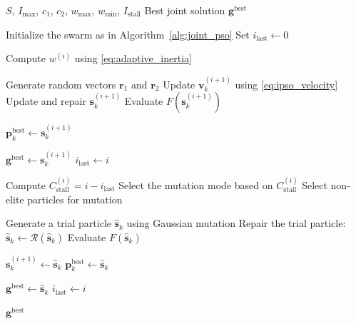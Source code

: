\documentclass[conference]{IEEEtran}
\begin{document}
\begin{algorithm}[!t]
\caption{Improved Joint PSO Algorithm}
\label{alg:ipso}
\footnotesize
\begin{algorithmic}[1]
\Require $S$, $I_{\max}$, $c_1$, $c_2$, $w_{\max}$, $w_{\min}$, $I_{\mathrm{stall}}$
\Ensure Best joint solution $\mathbf{g}^{\mathrm{best}}$

\State Initialize the swarm as in Algorithm~\ref{alg:joint_pso}
\State Set $i_{\mathrm{last}} \leftarrow 0$

    \State Compute $w^{(i)}$ using \eqref{eq:adaptive_inertia}

        \State Generate random vectors $\mathbf{r}_1$ and $\mathbf{r}_2$
        \State Update $\mathbf{v}_k^{(i+1)}$ using \eqref{eq:ipso_velocity}
        \State Update and repair $\mathbf{s}_k^{(i+1)}$
        \State Evaluate $F(\mathbf{s}_k^{(i+1)})$

            \State $\mathbf{p}_k^{\mathrm{best}} \leftarrow \mathbf{s}_k^{(i+1)}$
        \EndIf

            \State $\mathbf{g}^{\mathrm{best}} \leftarrow \mathbf{s}_k^{(i+1)}$
            \State $i_{\mathrm{last}} \leftarrow i$
        \EndIf
    \EndFor

    \State Compute $C_{\mathrm{stall}}^{(i)} = i - i_{\mathrm{last}}$
    \State Select the mutation mode based on $C_{\mathrm{stall}}^{(i)}$
    \State Select non-elite particles for mutation

        \State Generate a trial particle $\hat{\mathbf{s}}_k$ using Gaussian mutation
        \State Repair the trial particle: $\hat{\mathbf{s}}_k \leftarrow \mathcal{R}(\hat{\mathbf{s}}_k)$
        \State Evaluate $F(\hat{\mathbf{s}}_k)$

            \State $\mathbf{s}_k^{(i+1)} \leftarrow \hat{\mathbf{s}}_k$
            \State $\mathbf{p}_k^{\mathrm{best}} \leftarrow \hat{\mathbf{s}}_k$

                \State $\mathbf{g}^{\mathrm{best}} \leftarrow \hat{\mathbf{s}}_k$
                \State $i_{\mathrm{last}} \leftarrow i$
            \EndIf
        \EndIf
    \EndFor
\EndFor

\State \Return $\mathbf{g}^{\mathrm{best}}$
\end{algorithmic}
\end{algorithm}
\end{document}

